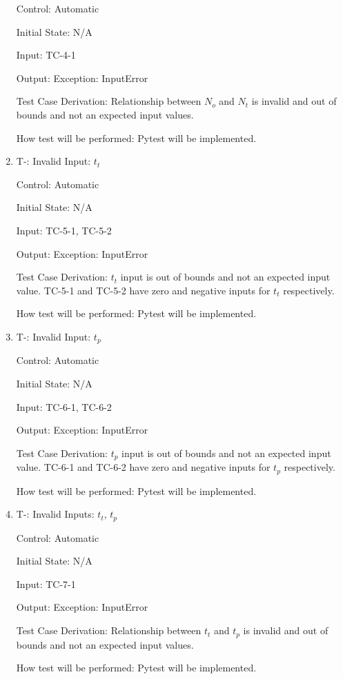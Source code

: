 \documentclass[12pt, titlepage]{article}
\newcounter{tinnum} %
\begin{document}
\begin{enumerate}
Control: Automatic
					
Initial State: N/A
					
Input: TC-4-1
					
Output: Exception: InputError

Test Case Derivation: Relationship between $N_o$ and $N_{t}$ is invalid and out 
of bounds and not an expected input values.

How test will be performed: Pytest will be implemented.


\item{T-}\thetinnum\label{T-5}: Invalid Input: $t_{t}$

Control: Automatic
					
Initial State: N/A
					
Input: TC-5-1, TC-5-2
					
Output: Exception: InputError

Test Case Derivation: $t_{t}$ input is out of bounds and not an expected input 
value. TC-5-1 and TC-5-2 have zero and negative inputs for $t_{t}$ respectively. 

How test will be performed: Pytest will be implemented.


\item{T-}\thetinnum\label{T-6}: Invalid Input: $t_{p}$

Control: Automatic
					
Initial State: N/A
					
Input: TC-6-1, TC-6-2
					
Output: Exception: InputError

Test Case Derivation: $t_{p}$ input is out of bounds and not an expected input 
value. TC-6-1 and TC-6-2 have zero and negative inputs for $t_{p}$ respectively. 

How test will be performed: Pytest will be implemented.


\item{T-}\thetinnum\label{T-7}: Invalid Inputs: $t_{t}$, $t_{p}$

Control: Automatic
					
Initial State: N/A
					
Input: TC-7-1
					
Output: Exception: InputError

Test Case Derivation: Relationship between $t_t$ and $t_{p}$ is invalid and out 
of bounds and not an expected input values.

How test will be performed: Pytest will be implemented.
 

\end{enumerate}
\end{document}
